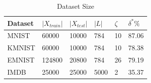 \begin{table}
\caption{Dataset Size}
\label{tab:dataset-size-ckd}
\begin{tabular}{llllll}
\toprule
Dataset & $|X_{train}|$ & $|X_{test}|$ & $|L|$ & $\zeta$ & $\delta^*\%$ \\
\midrule
MNIST & 60000 & 10000 & 784 & 10 & 87.06 \\
KMNIST & 60000 & 10000 & 784 & 10 & 78.38 \\
EMNIST & 124800 & 20800 & 784 & 26 & 79.19 \\
IMDB & 25000 & 25000 & 5000 & 2 & 35.37 \\
\bottomrule
\end{tabular}
\end{table}
